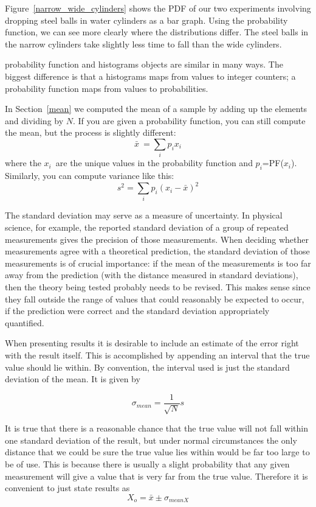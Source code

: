 Figure~\ref{narrow_wide_cylinders} shows the PDF of our two experiments involving dropping steel balls in water cylinders as a bar
graph.  Using the probability function, we can see more clearly where the distributions
differ.  The steel balls in the narrow cylinders take slightly less time to fall than the wide cylinders.



probability function and histograms objects are similar in many ways.   The
biggest difference is that a histograms maps from values to integer
counters; a probability function maps from values to probabilities.

%
%
In Section~\ref{mean} we computed the mean of a sample by adding up
the elements and dividing by $N$.  If you are given a probability function, you can
still compute the mean, but the process is slightly different:
%
\[ \bar{x} \ = \sum_i p_i x_i \]
%
where the $x_i$~are the unique values in the probability function and $p_i$=PF($x_i$).
Similarly, you can compute variance like this:
%
\[ s^2 = \sum_i p_i (x_i - \bar{x})^2\]



The standard deviation may serve as a measure of uncertainty. 
In physical science, for example, the reported standard deviation of a group of repeated measurements gives the precision of those measurements. When deciding whether measurements agree with a theoretical prediction, the standard deviation of those measurements is of crucial importance: if the mean of the measurements is too far away from the prediction (with the distance measured in standard deviations), then the theory being tested probably needs to be revised. This makes sense since they fall outside the range of values that could reasonably be expected to occur, if the prediction were correct and the standard deviation appropriately quantified. 


When presenting results it is desirable to include an estimate of the error right with the result itself. This is accomplished by appending an interval that the true value should lie within. By convention, the interval used is just the standard deviation of the mean. It is given by

\[ \sigma_{mean} = \frac{1}{\sqrt{N}} s \]

 It is true that there is a reasonable chance that the true value will not fall within one standard deviation of the result, but under normal circumstances the only distance that we could be sure the true value lies within would be far too large to be of use. This is because there is usually a slight probability that any given measurement will give a value that is very far from the true value. Therefore it is convenient to just state results as \begin{equation} X_o = \bar{x} \pm \sigma_{mean X} \end{equation}

